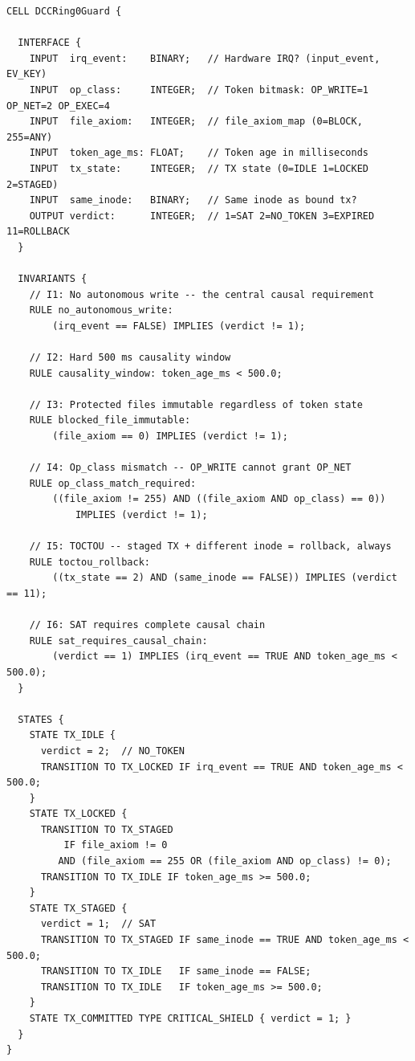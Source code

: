 \documentclass[11pt,a4paper,twoside]{article}
\begin{document}
\begin{lstlisting}[style=biostyle,caption={DCCRing0Guard -- canonical \texttt{.bio} specification}]
CELL DCCRing0Guard {

  INTERFACE {
    INPUT  irq_event:    BINARY;   // Hardware IRQ? (input_event, EV_KEY)
    INPUT  op_class:     INTEGER;  // Token bitmask: OP_WRITE=1 OP_NET=2 OP_EXEC=4
    INPUT  file_axiom:   INTEGER;  // file_axiom_map (0=BLOCK, 255=ANY)
    INPUT  token_age_ms: FLOAT;    // Token age in milliseconds
    INPUT  tx_state:     INTEGER;  // TX state (0=IDLE 1=LOCKED 2=STAGED)
    INPUT  same_inode:   BINARY;   // Same inode as bound tx?
    OUTPUT verdict:      INTEGER;  // 1=SAT 2=NO_TOKEN 3=EXPIRED 11=ROLLBACK
  }

  INVARIANTS {
    // I1: No autonomous write -- the central causal requirement
    RULE no_autonomous_write:
        (irq_event == FALSE) IMPLIES (verdict != 1);

    // I2: Hard 500 ms causality window
    RULE causality_window: token_age_ms < 500.0;

    // I3: Protected files immutable regardless of token state
    RULE blocked_file_immutable:
        (file_axiom == 0) IMPLIES (verdict != 1);

    // I4: Op_class mismatch -- OP_WRITE cannot grant OP_NET
    RULE op_class_match_required:
        ((file_axiom != 255) AND ((file_axiom AND op_class) == 0))
            IMPLIES (verdict != 1);

    // I5: TOCTOU -- staged TX + different inode = rollback, always
    RULE toctou_rollback:
        ((tx_state == 2) AND (same_inode == FALSE)) IMPLIES (verdict == 11);

    // I6: SAT requires complete causal chain
    RULE sat_requires_causal_chain:
        (verdict == 1) IMPLIES (irq_event == TRUE AND token_age_ms < 500.0);
  }

  STATES {
    STATE TX_IDLE {
      verdict = 2;  // NO_TOKEN
      TRANSITION TO TX_LOCKED IF irq_event == TRUE AND token_age_ms < 500.0;
    }
    STATE TX_LOCKED {
      TRANSITION TO TX_STAGED
          IF file_axiom != 0
         AND (file_axiom == 255 OR (file_axiom AND op_class) != 0);
      TRANSITION TO TX_IDLE IF token_age_ms >= 500.0;
    }
    STATE TX_STAGED {
      verdict = 1;  // SAT
      TRANSITION TO TX_STAGED IF same_inode == TRUE AND token_age_ms < 500.0;
      TRANSITION TO TX_IDLE   IF same_inode == FALSE;
      TRANSITION TO TX_IDLE   IF token_age_ms >= 500.0;
    }
    STATE TX_COMMITTED TYPE CRITICAL_SHIELD { verdict = 1; }
  }
}
\end{lstlisting}
\end{document}
